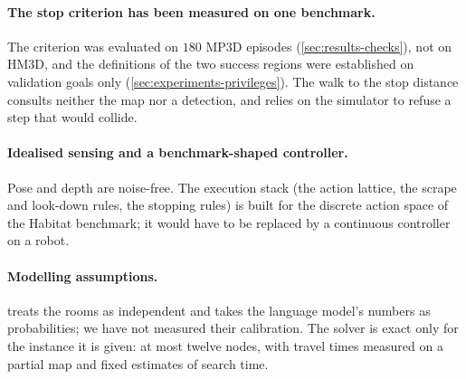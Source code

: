\documentclass[10pt]{article}
\begin{document}
\paragraph{The stop criterion has been measured on one benchmark.} The
criterion was evaluated on $180$ MP3D episodes (\cref{sec:results-checks}), not
on HM3D, and the definitions of the two success regions were established on
validation goals only (\cref{sec:experiments-privileges}). The walk to the stop
distance consults neither the map nor a detection, and relies on the simulator
to refuse a step that would collide.

\paragraph{Idealised sensing and a benchmark-shaped controller.} Pose and
depth are noise-free. The execution stack (the action lattice, the scrape and
look-down rules, the stopping rules) is built for the discrete action space
of the Habitat benchmark; it would have to be replaced by a continuous
controller on a robot.

\paragraph{Modelling assumptions.}  treats the
rooms as independent and takes the language model's numbers as probabilities;
we have not measured their calibration. The solver is exact only for the
instance it is given: at most twelve nodes, with travel times measured on a
partial map and fixed estimates of search time.

\end{document}

